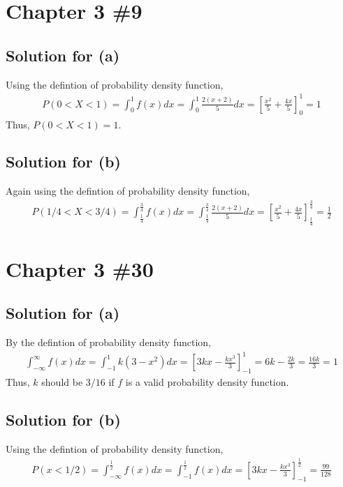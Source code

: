 \documentclass{scrartcl}
\begin{document}
\section{Chapter 3 \#9}
\subsection{Solution for (a)}
Using the defintion of probability density function,
\begin{align*}
  P(0 < X < 1) = \int^1_0 f(x) dx = \int^1_0 \frac{2(x + 2)}{5} dx
  = \left[ \frac{x^2}{5} + \frac{4x}{5} \right]^1_0 = 1
\end{align*}
Thus, \(P(0 < X < 1) = 1\).

\subsection{Solution for (b)}
Again using the defintion of probability density function,
\begin{align*}
  P(1/4 < X < 3/4) = \int^{\frac{3}{4}}_{\frac{1}{4}} f(x) dx
  = \int^{\frac{3}{4}}_{\frac{1}{4}} \frac{2(x + 2)}{5} dx
  = \left[ \frac{x^2}{5} + \frac{4x}{5} \right]^{\frac{3}{4}}_{\frac{1}{4}}
  = \frac{1}{2}
\end{align*}

\section{Chapter 3 \#30}
\subsection{Solution for (a)}
By the defintion of probability density function,
\begin{align*}
  \int^\infty_{-\infty} f(x) dx = \int^1_{-1} k(3 - x^2) dx
  = \left[ 3kx - \frac{kx^3}{3} \right]^1_{-1}
  = 6k - \frac{2k}{3} = \frac{16k}{3} = 1
\end{align*}
Thus, \(k\) should be \(3/16\) if \(f\) is a valid probability density function.

\subsection{Solution for (b)}
Using the defintion of probability density function,
\begin{align*}
  P(x < 1/2) = \int^{\frac{1}{2}}_{-\infty} f(x) dx
  = \int^{\frac{1}{2}}_{-1} f(x) dx
  = \left[ 3kx - \frac{kx^3}{3} \right]^{\frac{1}{2}}_{-1} = \frac{99}{128}
\end{align*}
\end{document}
